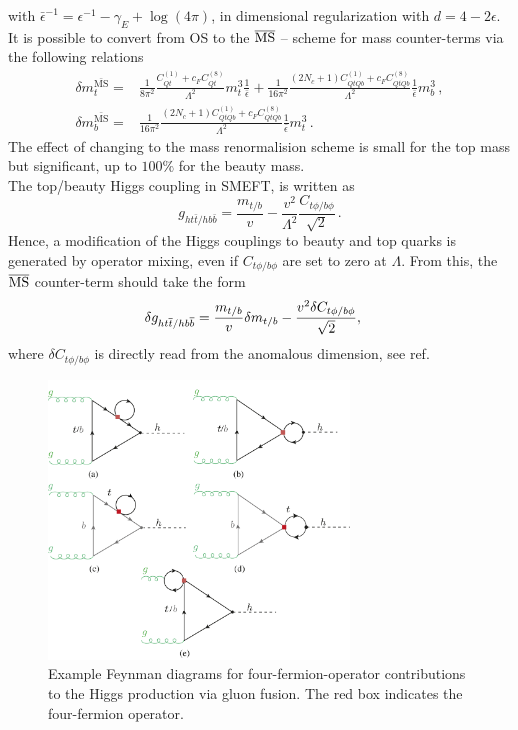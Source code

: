 with $\bar{\epsilon}^{-1} = \epsilon^{-1}- \gamma_E +\log(4 \pi)$, in dimensional regularization with $d=4-2\epsilon$. 
It is possible to convert from OS to the $\MSbar$ -- scheme for mass counter-terms via the following relations
\begin{align}
	\delta m_t^{\bar{\text{MS}}} =&\frac{1}{8 \pi^2} \frac{C_{Qt}^{(1)}+c_F C_{Qt}^{(8)}}{\Lambda^2}m_t^3\frac{1}{\bar{\epsilon}}+ \frac{1}{16 \pi^2}  \frac{(2 N_c+1) C_{QtQb}^{(1)}+c_F C_{QtQb}^{(8)}}{\Lambda^2}   \frac{1}{\bar{\epsilon}}  m_b^3\,,  \\
	\delta m_b^{\bar{\text{MS}}}=&\frac{1}{16 \pi^2} \frac{(2 N_c+1)C_{QtQb}^{(1)}+c_F C_{QtQb}^{(8)}}{\Lambda^2}\frac{1}{\bar{\epsilon}} m_t^3\,.
\end{align} 
The effect of changing to the mass renormalision  scheme is small for the top mass but  significant, up to $100\%$ for the beauty mass. \\
 The top/beauty Higgs coupling in SMEFT, is written as
\begin{equation}
	g_{ht\bar{t}/hb\bar{b}}=\frac{m_{t/b}}{v}-\frac{v^2}{\Lambda^2}\frac{C_{t\phi/b\phi}}{\sqrt{2}}\,.
\end{equation}
Hence, a modification of the Higgs couplings to beauty and top quarks is generated by operator mixing, even if $C_{t\phi/b\phi}$ are set to zero at $\Lambda$. From this, the $\MSbar$ counter-term should take the form 
\begin{align}
	\delta	g_{ht\bar{t}/hb\bar{b}} &=  {m_{t/b}\over v} \delta{m_{t/b}} -{v^2 \delta{C_{t\phi/b\phi}}\over \sqrt{2} },
\end{align}
where $\delta{C_{t\phi/b\phi}}$ is directly read from the anomalous dimension, see ref.~\cite{Alonso:2013hga}
\begin{figure}[h!]
	\begin{center}
		\includegraphics[width=8cm]{fig/ggF-4F_NLO.pdf}
		\caption{Example Feynman diagrams for four-fermion-operator contributions to the Higgs production via gluon fusion. The red box indicates the four-fermion operator.\label{fig:ggh} }
	\end{center}
		\vspace{-1.5 cm}
\end{figure}
